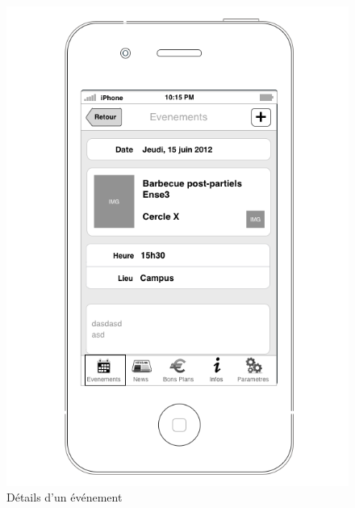\documentclass[a4paper, 11pt]{article}
\begin{document}
\begin{figure}[h!]
	\begin{minipage}[c]{.50\linewidth}
		\begin{center}
			\includegraphics[scale=0.28]{../../Sketch/iOS/evenements_detail.png}
		\end{center}
	\caption{Détails d'un événement}
	\end{minipage}
	\hfill
	\begin{minipage}[c]{.50\linewidth}
		\begin{center}

\end{center}
\end{minipage}
\end{figure}
\end{document}
